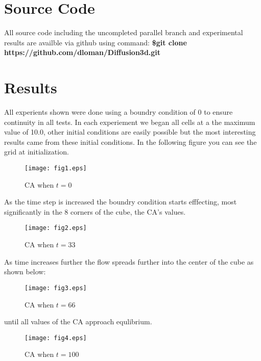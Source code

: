 \documentclass[11pt,twocolumn]{article}
\begin{document}
\section{Source Code}

All source code including the uncompleted parallel branch and experimental results are availble 
via github using command: \textbf{\$git clone https://github.com/dloman/Diffusion3d.git}

\section{Results}
All experients shown were done using a boundry condition of 0 to ensure continuity in all tests. In each experiement we began all cells at a the maximum value of 10.0, other initial conditions are easily possible but the most interesting results came from these initial conditions. In the following figure you can see the grid at initialization.
\begin{figure}[ht!]
\centering
\caption{CA when $t=0$}
\texttt{[image: fig1.eps]}
\end{figure}

\vspace{7mm}

As the time step is increased the boundry condition starts efffecting, most significantly in the 8 corners of the cube, the CA's values.
 

\begin{figure}[ht!]
\centering
\caption{CA when $t=33$}
\texttt{[image: fig2.eps]}
\end{figure}

\vspace{7mm}

As time increases further the flow spreads further into the center of the cube as shown below:

\vspace{5mm}

\begin{figure}[ht!]
\centering
\caption{CA when $t=66$}
\texttt{[image: fig3.eps]}
\end{figure}

\vspace{100mm}

until all values of the CA approach equlibrium.

\begin{figure}[ht!]
\centering
\caption{CA when $t=100$}
\texttt{[image: fig4.eps]}
\end{figure}
\end{document}
